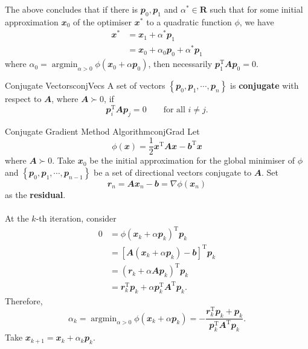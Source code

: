 \documentclass[math, code]{amznotes}
\theoremstyle{remark}
\DeclareMathOperator*{\argmin}{argmin}
\begin{document}
The above concludes that if there is $\mathbfit{p}_0, \mathbfit{p}_1$ and $\alpha^* \in \mathbf{R}$ such that for some initial approximation $\mathbfit{x}_0$ of the optimiser $\mathbfit{x}^*$ to a quadratic function $\phi$, we have
\begin{align*}
    \mathbfit{x}^* & = \mathbfit{x}_1 + \alpha^*\mathbfit{p}_1 \\
    & = \mathbfit{x}_0 + \alpha_0\mathbfit{p}_0 + \alpha^*\mathbfit{p}_1
\end{align*}
where $\alpha_0 = \argmin_{\alpha > 0} \phi(\mathbfit{x}_0 + \alpha\mathbfit{p}_0)$, then necessarily $\mathbfit{p}_1^{\mathrm{T}}\mathbfit{Ap}_0 = 0$.
\begin{dfnbox}{Conjugate Vectors}{conjVecs}
    A set of vectors $\left\{\mathbfit{p}_0, \mathbfit{p}_1, \cdots, \mathbfit{p}_n\right\}$ is {\color{red} \textbf{conjugate}} with respect to $\mathbfit{A}$, where $\mathbfit{A} \succ 0$, if
    \begin{equation*}
        \mathbfit{p}_i^{\mathrm{T}}\mathbfit{Ap}_j = 0 \qquad \textrm{for all } i \neq j.
    \end{equation*}
\end{dfnbox}
\begin{tecbox}{Conjugate Gradient Method Algorithm}{conjGrad}
    Let 
    \begin{equation*}
        \phi(\mathbfit{x}) = \frac{1}{2}\mathbfit{x}^{\mathrm{T}}\mathbfit{Ax} - \mathbfit{b}^{\mathrm{T}}\mathbfit{x}
    \end{equation*}
    where $\mathbfit{A} \succ 0$. Take $\mathbfit{x}_0$ be the initial approximation for the global minimiser of $\phi$ and $\left\{\mathbfit{p}_0, \mathbfit{p}_1, \cdots, \mathbfit{p}_{n - 1}\right\}$ be a set of directional vectors conjugate to $\mathbfit{A}$. Set
    \begin{equation*}
        \mathbfit{r}_n = \mathbfit{Ax}_n - \mathbfit{b} = \nabla \phi(\mathbfit{x}_n)
    \end{equation*}
    as the {\color{red} \textbf{residual}}.
    \\\\
    At the $k$-th iteration, consider
    \begin{align*}
        0 & = \phi(\mathbfit{x}_k + \alpha\mathbfit{p}_k)^{\mathrm{T}}\mathbfit{p}_k \\
        & = \left[\mathbfit{A}(\mathbfit{x}_k + \alpha\mathbfit{p}_k) - \mathbfit{b}\right]^{\mathrm{T}}\mathbfit{p}_k \\
        & = \left(\mathbfit{r}_k + \alpha\mathbfit{Ap}_k\right)^{\mathrm{T}}\mathbfit{p}_k \\
        & = \mathbfit{r}_k^{\mathrm{T}}\mathbfit{p}_k + \alpha\mathbfit{p}_k^{\mathrm{T}}\mathbfit{A}^{\mathrm{T}}\mathbfit{p}_k.
    \end{align*}
    Therefore,
    \begin{equation*}
        \alpha_k = \argmin_{\alpha > 0}\phi(\mathbfit{x}_k + \alpha\mathbfit{p}_k) = -\frac{\mathbfit{r}_k^{\mathrm{T}}\mathbfit{p}_k + \mathbfit{p}_k}{\mathbfit{p}_k^{\mathrm{T}}\mathbfit{A}^{\mathrm{T}}\mathbfit{p}_k}.
    \end{equation*}
    Take $\mathbfit{x}_{k + 1} = \mathbfit{x}_k + \alpha_k\mathbfit{p}_k$.
\end{tecbox}
\end{document}
